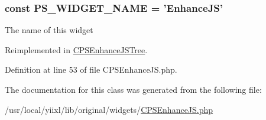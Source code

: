 \hypertarget{classCPSEnhanceJS_ae357f9dc377f7de0d12010b2ced28cbc}{
\subsubsection[{PS\_\-WIDGET\_\-NAME}]{\setlength{\rightskip}{0pt plus 5cm}const {\bf PS\_\-WIDGET\_\-NAME} = 'EnhanceJS'}}
\label{classCPSEnhanceJS_ae357f9dc377f7de0d12010b2ced28cbc}
The name of this widget 

Reimplemented in \hyperlink{classCPSEnhanceJSTree_ae357f9dc377f7de0d12010b2ced28cbc}{CPSEnhanceJSTree}.



Definition at line 53 of file CPSEnhanceJS.php.



The documentation for this class was generated from the following file:\begin{DoxyCompactItemize}
\item 
/usr/local/yiixl/lib/original/widgets/\hyperlink{CPSEnhanceJS_8php}{CPSEnhanceJS.php}\end{DoxyCompactItemize}
